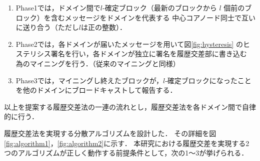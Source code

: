 \documentclass[a4paper,12pt]{jsarticle}
\begin{document}
\hspace{5mm}
%
\begin{enumerate}
    \item Phase1では，ドメイン間で$l$-確定ブロック（最新のブロックから 
          $l$ 個前のブロック）を含むメッセージをドメインを代表する
          中心コアノード同士で互いに送り合う（ただし$l$は正の整数）．

    \item Phase2では，各ドメインが届いたメッセージを用いて図\ref{fig:hysteresis}
          のヒステリシス署名を行い，各ドメインが独立に署名を履歴交差部に書き込む
          為のマイニングを行う．（従来のマイニングと同様）

    \item Phase3では，マイニングし終えたブロックが，$l$-確定ブロックになったこと
          を他のドメインにブロードキャストして報告する．
\end{enumerate}
%
\hspace{5mm}
以上を提案する履歴交差法の一連の流れとし，履歴交差法を各ドメイン間で自律的に行う．

履歴交差法を実現する分散アルゴリズム\cite{manabe}を設計した．
その詳細を図 \ref{fig:algorithm1}，\ref{fig:algorithm2}に示す．
本研究における履歴交差を実現する2つのアルゴリズムが正しく動作する前提条件として，次の1〜3が挙げられる．
\end{document}
